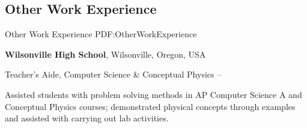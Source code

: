 \documentclass[letterpaper,MMMyyyy,nonstop]{simpleresumecv}
\begin{document}
\begin{body}

\iffalse

\section
{Campus Activities}
{Campus Activities}
{PDF:CampusActivities}

\href{http://groups.engr.oregonstate.edu/ieee-new}
{\textbf{IEEE @ OSU}},
Oregon State University

\GapNoBreak
\BulletItem
Web Administrator
\hfill
\DatestampYMD{2015}{11}{05} --
\DatestampYMD{2016}{06}{10}
\begin{detail}
\SubBulletItem
Maintained and wrote web articles \& pages for the IEEE presence at Oregon State University; Worked to revitalize campus presence before merging with the Robotics Club.
\end{detail}

\href{http://osurobotics.club}
{\textbf{OSU Robotics Club}},
Oregon State University

\GapNoBreak
\BulletItem
Rover Team, Electrical Sub-team member
\hfill
\DatestampYMD{2015}{9}{29} --
Present
\begin{detail}
\SubBulletItem
Helped with small subprojects regarding the Mars Rover Robot as a member of the Electrical sub-team.
\end{detail}

\fi


\iffalse

\section
{Other Work\newline
Experience}
{Other Work Experience}
{PDF:OtherWorkExperience}

\textbf{Wilsonville High School},
Wilsonville, Oregon, USA

\GapNoBreak
\BulletItem
Teacher's Aide,
Computer Science \& Conceptual Physics
\hfill
{} --
\begin{detail}
\SubBulletItem
Assisted students with problem solving methods in AP Computer Science A and Conceptual Physics courses; demonstrated physical concepts through examples and assisted with carrying out lab activities.
\end{detail}


\end{body}
\end{document}
